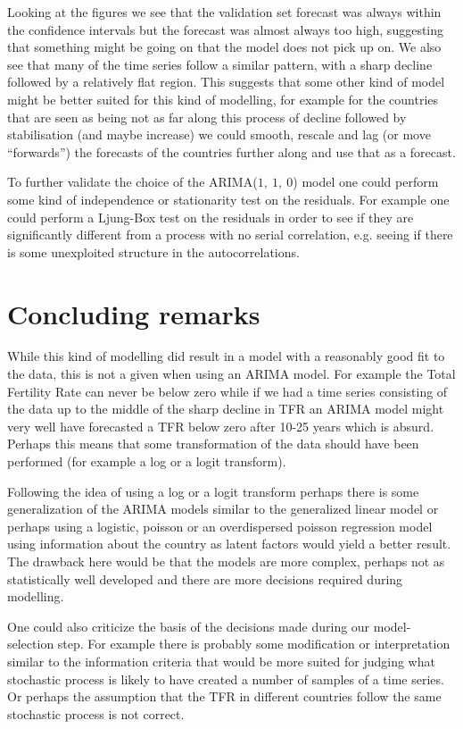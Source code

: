 \documentclass[a4paper, 12pt]{scrartcl}
\begin{document}
Looking at the figures we see that the validation set forecast was always within the confidence intervals but the forecast was almost always too high, suggesting that something might be going on that the model does not pick up on.
We also see that many of the time series follow a similar pattern, with a sharp decline followed by a relatively flat region.
This suggests that some other kind of model might be better suited for this kind of modelling, for example for the countries that are seen as being not as far along this process of decline followed by stabilisation (and maybe increase) we could smooth, rescale and lag (or move ``forwards'') the forecasts of the countries further along and use that as a forecast.

To further validate the choice of the ARIMA($1,~1,~0$) model one could perform some kind of independence or stationarity test on the residuals.
For example one could perform a Ljung-Box test on the residuals in order to see if they are significantly different from a process with no serial correlation, e.g. seeing if there is some unexploited structure in the autocorrelations.

\section{Concluding remarks}
While this kind of modelling did result in a model with a reasonably good fit to the data, this is not a given when using an ARIMA model.
For example the Total Fertility Rate can never be below zero while if we had a time series consisting of the data up to the middle of the sharp decline in TFR an ARIMA model might very well have forecasted a TFR below zero after 10-25 years which is absurd.
Perhaps this means that some transformation of the data should have been performed (for example a log or a logit transform).

Following the idea of using a log or a logit transform perhaps there is some generalization of the ARIMA models similar to the generalized linear model or perhaps using a logistic, poisson or an overdispersed poisson regression model using information about the country as latent factors would yield a better result.
The drawback here would be that the models are more complex, perhaps not as statistically well developed and there are more decisions required during modelling.

One could also criticize the basis of the decisions made during our model-selection step.
For example there is probably some modification or interpretation similar to the information criteria that would be more suited for judging what stochastic process is likely to have created a number of samples of a time series.
Or perhaps the assumption that the TFR in different countries follow the same stochastic process is not correct.
\end{document}
